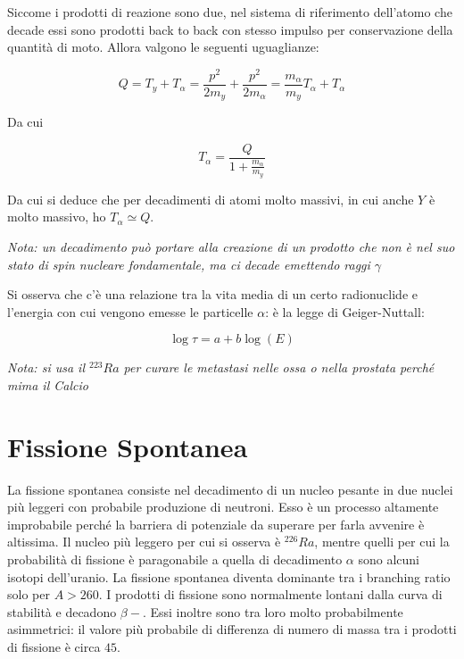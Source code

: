 Siccome i prodotti di reazione sono due, nel sistema di riferimento dell'atomo che decade essi sono prodotti back to back con stesso impulso per conservazione della quantità di moto. Allora valgono le seguenti uguaglianze:

\begin{equation}
Q=T_y+T_{\alpha}=\frac{p^2}{2m_y}+\frac{p^2}{2m_{\alpha}}=\frac{m_{\alpha}}{m_y}T_{\alpha}+T_{\alpha}
\end{equation}

Da cui

\begin{equation}
T_{\alpha}=\frac{Q}{1+\frac{m_{\alpha}}{m_y}} 
\end{equation}

Da cui si deduce che per decadimenti di atomi molto massivi, in cui anche $Y$ è molto massivo, ho $T_{\alpha}\simeq Q$.

\emph{Nota: un decadimento può portare alla creazione di un prodotto che non è nel suo stato di spin nucleare fondamentale, ma ci decade emettendo raggi $\gamma$ }

Si osserva che c'è una relazione tra la vita media di un certo radionuclide e l'energia con cui vengono emesse le particelle $\alpha$: è la legge di Geiger-Nuttall:

\begin{equation}
\log \tau = a + b \log (E)
\end{equation}

\emph{Nota: si usa il $^{223}Ra$ per curare le metastasi nelle ossa o nella prostata perché mima il Calcio}

\section{Fissione Spontanea}

La fissione spontanea consiste nel decadimento di un nucleo pesante in due nuclei più leggeri con probabile produzione di neutroni. Esso è un processo altamente improbabile perché la barriera di potenziale da superare per farla avvenire è altissima. Il nucleo più leggero per cui si osserva è $^{226}Ra$, mentre quelli per cui la probabilità di fissione è paragonabile a quella di decadimento $\alpha$ sono alcuni isotopi dell'uranio. La fissione spontanea diventa dominante tra i branching ratio solo per $A>260$.
I prodotti di fissione sono normalmente lontani dalla curva di stabilità e decadono $\beta-$. 
Essi inoltre sono tra loro molto probabilmente asimmetrici: il valore più probabile di differenza di numero di massa tra i prodotti di fissione è circa $45$.

